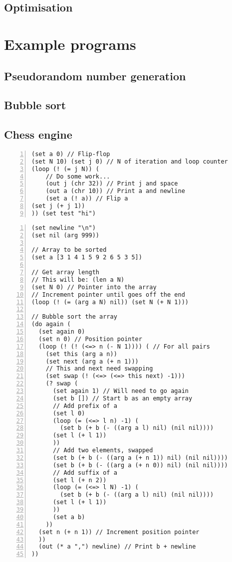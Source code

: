 \documentclass[aip,jcp,reprint,footinbib]{revtex4-1}
\begin{document}
\subsection{Optimisation}

\section{Example programs}
\subsection{Pseudorandom number generation}
\subsection{Bubble sort}
\subsection{Chess engine}

\begin{lstlisting}[language=psll,frame=tb,numbers=left,aboveskip=3mm,belowskip=3mm]
(set a 0) // Flip-flop
(set N 10) (set j 0) // N of iteration and loop counter
(loop (! (= j N)) (
    // Do some work...
    (out j (chr 32)) // Print j and space
    (out a (chr 10)) // Print a and newline
    (set a (! a)) // Flip a
(set j (+ j 1))
)) (set test "hi")
\end{lstlisting}

\begin{lstlisting}[language=psll,frame=tb,numbers=left,aboveskip=3mm,belowskip=3mm]
(set newline "\n")
(set nil (arg 999))

// Array to be sorted
(set a [3 1 4 1 5 9 2 6 5 3 5])

// Get array length
// This will be: (len a N)
(set N 0) // Pointer into the array
// Increment pointer until goes off the end
(loop (! (= (arg a N) nil)) (set N (+ N 1)))

// Bubble sort the array
(do again (
  (set again 0)
  (set n 0) // Position pointer
  (loop (! (! (<=> n (- N 1)))) ( // For all pairs
    (set this (arg a n))
    (set next (arg a (+ n 1)))
    // This and next need swapping
    (set swap (! (<=> (<=> this next) -1)))
    (? swap (
      (set again 1) // Will need to go again
      (set b []) // Start b as an empty array
      // Add prefix of a
      (set l 0)
      (loop (= (<=> l n) -1) (
        (set b (+ b (- ((arg a l) nil) (nil nil))))
      (set l (+ l 1))
      ))
      // Add two elements, swapped
      (set b (+ b (- ((arg a (+ n 1)) nil) (nil nil))))
      (set b (+ b (- ((arg a (+ n 0)) nil) (nil nil))))
      // Add suffix of a
      (set l (+ n 2))
      (loop (= (<=> l N) -1) (
        (set b (+ b (- ((arg a l) nil) (nil nil))))
      (set l (+ l 1))
      ))
      (set a b)
    ))
  (set n (+ n 1)) // Increment position pointer
  ))
  (out (* a ",") newline) // Print b + newline
))
\end{lstlisting}
\end{document}
